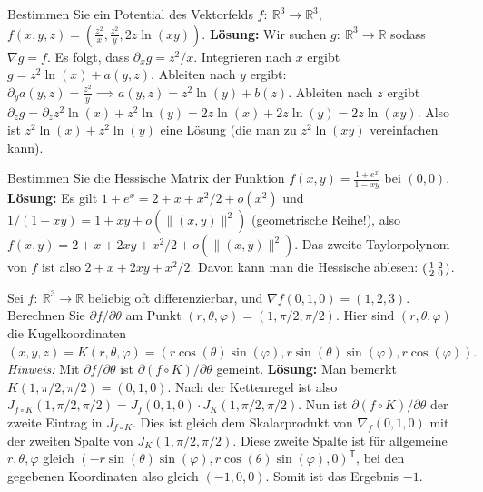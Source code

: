\documentclass[a4paper,10pt]{article}
\def\R{\mathbb{R}}
\begin{document}
Bestimmen Sie ein Potential des Vektorfelds \( f: \: \R^3 \to \R^3 \),
\(
    f(x, y, z) = \left( \frac{z^2}{x}, \frac{z^2}{y}, 2z \ln(xy) \right) \text{.}
\)
\textbf{Lösung:} Wir suchen \( g: \: \R^3 \to \R \) sodass \( \nabla g = f \). Es folgt, dass \( \partial_x g = z^2 / x \). Integrieren nach \( x \) ergibt \( g = z^2 \ln(x) + a(y, z) \). Ableiten nach \( y \) ergibt:
\(
    \partial_y a(y, z) = \frac{z^2}{y} \implies a(y, z) = z^2 \ln(y) + b(z) \text{.}
\)
Ableiten nach \( z \) ergibt
\(
    \partial_z g = \partial_z z^2 \ln(x) + z^2 \ln(y) = 2z \ln(x) + 2z \ln(y) = 2z \ln(xy) \text{.}
\)
Also ist \( z^2 \ln(x) + z^2 \ln(y) \) eine Lösung (die man zu \( z^2 \ln(xy) \) vereinfachen kann).

Bestimmen Sie die Hessische Matrix der Funktion
\(
    f(x, y) = \frac{1 + e^x}{1 - xy}
\)
bei \( (0, 0) \).
\textbf{Lösung:} Es gilt \( 1 + e^x = 2 + x + x^2/2 + o(x^2) \) und \( 1/(1 - xy) = 1 + xy + o(\lVert (x, y) \rVert^2) \) (geometrische Reihe!), also
\(
    f(x, y) = 2 + x + 2xy + x^2/2 + o(\lVert (x, y) \rVert^2) \text{.}
\)
Das zweite Taylorpolynom von \( f \) ist also \( 2 + x + 2xy + x^2/2 \). Davon kann man die Hessische ablesen: \( \begin{psmallmatrix} 1 & 2 \\ 2 & 0 \end{psmallmatrix} \).

Sei \( f: \: \R^3 \to \R \) beliebig oft differenzierbar, und \( \nabla f(0, 1, 0) = (1, 2, 3) \). Berechnen Sie \( \partial f / \partial \theta \) am Punkt \( (r, \theta, \varphi) = (1, \pi / 2, \pi / 2) \). Hier sind \( (r, \theta, \varphi) \) die Kugelkoordinaten
\(
    (x, y, z) = K(r, \theta, \varphi) = (r \cos(\theta) \sin(\varphi), r \sin(\theta) \sin(\varphi), r \cos(\varphi)) \text{.}
\)
\textit{Hinweis:} Mit \( \partial f / \partial \theta \) ist \( \partial (f \circ K) / \partial \theta \) gemeint.
\textbf{Lösung:} Man bemerkt \( K(1, \pi / 2, \pi / 2) = (0, 1, 0) \). Nach der Kettenregel ist also
\(
    J_{f \circ K}(1, \pi / 2, \pi / 2) = J_f(0, 1, 0) \cdot J_K(1, \pi / 2, \pi / 2) \text{.}
\)
Nun ist \( \partial(f \circ K) / \partial \theta \) der zweite Eintrag in \( J_{f \circ K} \). Dies ist gleich dem Skalarprodukt von \( \nabla_f(0, 1, 0) \) mit der zweiten Spalte von \( J_K(1, \pi / 2, \pi / 2) \). Diese zweite Spalte ist für allgemeine \( r, \theta, \varphi \) gleich
\(
    (-r \sin(\theta) \sin(\varphi), r \cos(\theta) \sin(\varphi), 0)^\mathsf{T} \text{,}
\)
bei den gegebenen Koordinaten also gleich \( (-1, 0, 0) \). Somit ist das Ergebnis \( -1 \).
\end{document}
